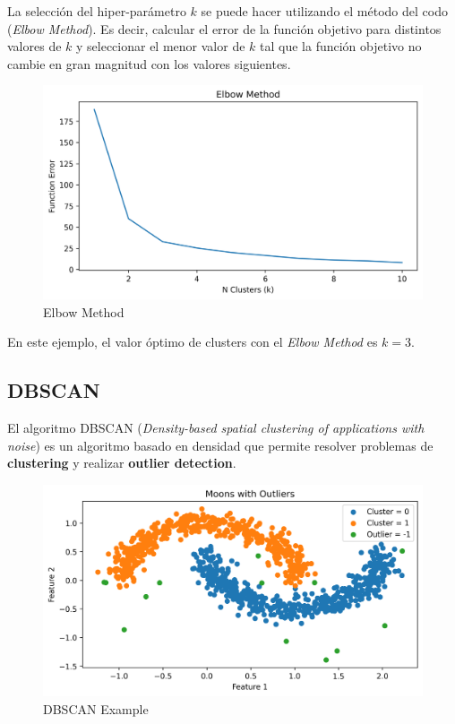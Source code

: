 La selección del hiper-parámetro $k$ se puede hacer utilizando el método del codo (\textit{Elbow Method}). Es decir, calcular el error de la función objetivo para distintos valores de $k$ y seleccionar el menor valor de $k$ tal que la función objetivo no cambie en gran magnitud con los valores siguientes. 

\begin{figure}[H]
    \center
    \includegraphics[scale=0.45]{notebooks/ML/img/elbow_method_k_means.png}
    \caption{Elbow Method}
\end{figure}

En este ejemplo, el valor óptimo de clusters con el \textit{Elbow Method} es $k=3$.  

\subsection{DBSCAN}

El algoritmo DBSCAN (\textit{Density-based spatial clustering of applications with noise}) es un algoritmo basado en densidad que permite resolver problemas de \textbf{clustering} y realizar \textbf{outlier detection}. 

\begin{figure}[H]
    \center
    \includegraphics[scale=0.5]{notebooks/ML/img/dbscan_on_moons.png}
    \caption{DBSCAN Example}
\end{figure}

